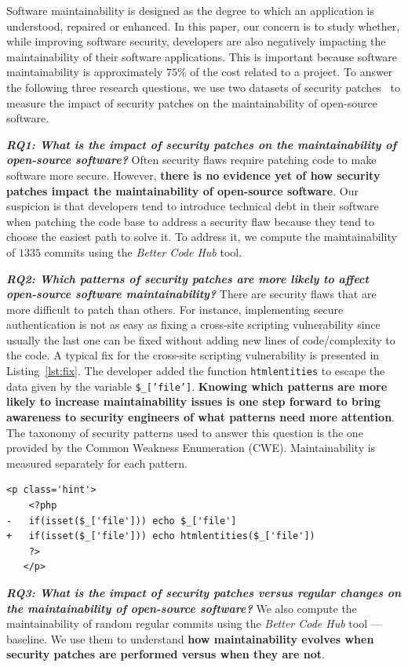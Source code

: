 \documentclass[10pt,conference]{IEEEtran}
\newcounter{lstannotation}
\begin{document}
Software maintainability is designed as the degree to which an application is understood, 
repaired or enhanced. In this paper, our concern is to study whether, while improving software
security, developers are also negatively impacting the maintainability of their
software applications. This is important because software maintainability is 
approximately $75\%$ of the cost related to a project. To answer the following three 
research questions, we use two datasets of security patches~\cite{Reis:2017:IJSSE, 10.1109/MSR.2019.00064} 
to measure the impact of
security patches on the maintainability of open-source software. 
%

\textit{\textbf{RQ1: What is the impact of security patches on the
maintainability of open-source software?}} Often security flaws require patching 
code to make software more secure.
However, \textbf{there is no evidence yet of how security patches impact the
maintainability of open-source software}. Our suspicion is that developers tend
to introduce technical debt in their software when patching the code base to
address a security flaw because they tend to choose the easiest path to solve
it. To address it, we compute the maintainability of $1335$ commits using the
\emph{Better Code Hub} tool. 
%

\textit{\textbf{RQ2: Which patterns of security patches are more likely to
affect open-source software maintainability?}}
There are security flaws that are more difficult to patch than others. For
instance, implementing secure authentication is not as easy as fixing a
cross-site scripting vulnerability since usually the last one can be fixed
without adding new lines of code/complexity to the code. A typical fix for 
the cross-site scripting vulnerability is presented in Listing~\ref{lst:fix}. The developer added the function \texttt{htmlentities} to escape the data given by the variable
\texttt{\$\_['file']}. \textbf{Knowing which patterns are more likely to increase
maintainability issues is one step forward to bring awareness to security
engineers of what patterns need more attention}. The taxonomy of security
patterns used to answer this question is the one provided by the Common Weakness Enumeration
(CWE). Maintainability is measured
separately for each pattern.
%
\setcounter{lstannotation}{0}
\begin{lstlisting}[style={PHPStyle}, caption={Fix provided by \texttt{nextcloud/server} developers to a \\Cross-Site Scripting vulnerability},label={lst:fix}]
   <p class='hint'>
    <?php
-   if(isset($_['file'])) echo $_['file']
+   if(isset($_['file'])) echo htmlentities($_['file'])
    ?>
   </p>
\end{lstlisting}
%
\textit{\textbf{RQ3: What is the impact of security patches versus regular changes on the
maintainability of open-source software?}}
%
We also compute the maintainability of random regular commits using the
\emph{Better Code Hub} tool --- baseline.  We use them to understand \textbf{how
maintainability evolves when security patches are performed versus when
they are not}.
%
\end{document}
